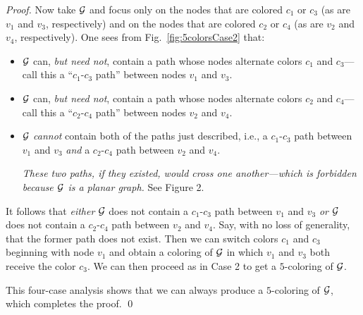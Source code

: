 {\begin{proof}
Now take $\mbox{$\cal G$}$ and focus only on the nodes that are colored $c_1$ or
$c_3$ (as are $v_1$ and $v_3$, respectively) and on the nodes that are
colored $c_2$ or $c_4$ (as are $v_2$ and $v_4$, respectively).  One
sees from Fig.~\ref{fig:5colorsCase2} that:
\begin{itemize}
\item
$\mbox{$\cal G$}$ can, {\em but need not}, contain a path whose nodes alternate
  colors $c_1$ and $c_3$---call this a ``$c_1$-$c_3$ path'' between
  nodes $v_1$ and $v_3$.
\item
$\mbox{$\cal G$}$ can, {\em but need not}, contain a path whose nodes alternate
  colors $c_2$ and $c_4$---call this a ``$c_2$-$c_4$ path'' between
  nodes $v_2$ and $v_4$.
\item
$\mbox{$\cal G$}$ {\em cannot} contain both of the paths just described, i.e., a
  $c_1$-$c_3$ path between $v_1$ and $v_3$ {\em and} a $c_2$-$c_4$ path
  between $v_2$ and $v_4$.

{\em These two paths, if they existed, would cross one another---which
  is forbidden because $\mbox{$\cal G$}$ is a {\em planar} graph.}  See Figure 2.
\end{itemize}
It follows that {\em either} $\mbox{$\cal G$}$ does not contain a $c_1$-$c_3$ path
between $v_1$ and $v_3$ {\em or} $\mbox{$\cal G$}$ does not contain a $c_2$-$c_4$
path between $v_2$ and $v_4$.  Say, with no loss of generality, that
the former path does not exist.  Then we can switch colors $c_1$ and
$c_3$ beginning with node $v_1$ and obtain a coloring of $\mbox{$\cal G$}$ in which
$v_1$ and $v_3$ both receive the color $c_3$.  We can then proceed as
in Case 2 to get a $5$-coloring of $\mbox{$\cal G$}$.

This four-case analysis shows that we can always produce a
$5$-coloring of $\mbox{$\cal G$}$, which completes the proof.  \qed
\end{proof}
}
